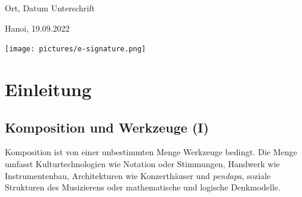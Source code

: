 \documentclass[12pt,a4paper,ngerman]{article}
\begin{document}
\vspace{4cm}

\hspace{2cm} Ort, Datum \hfill Unterschrift \hspace{2cm}

\vspace{0.2cm}

\hspace{2cm} Hanoi, 19.09.2022

\vspace{-1cm}
\hspace{2cm}                   \hfill \texttt{[image: pictures/e-signature.png]} \hspace{2cm}



\newpage

{
    \tableofcontents
}


\newpage


\newpage

\listoffigures
\listoftables


\newpage
{}

\section{Einleitung}

\subsection{Komposition und Werkzeuge (I)}

\noindent
Komposition ist von einer unbestimmten Menge Werkzeuge bedingt.
Die Menge umfasst Kulturtechnologien wie Notation oder Stimmungen, Handwerk wie Instrumentenbau, Architekturen wie Konzerthäuser und \emph{pendapa}, soziale Strukturen des Musizierens oder mathematische und logische Denkmodelle.
\end{document}
